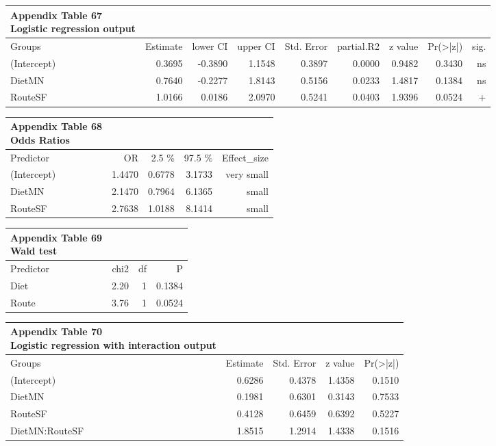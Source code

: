 \documentclass[
  12pt,
  letterpaper,
]{article}
\begin{document}
\begingroup
\fontsize{12.0pt}{14.4pt}\selectfont
\begin{longtable}{l|rrrrrrrr}
\caption*{
{\large \textbf{Appendix Table 67}} \\ 
{\small \textbf{Logistic regression output}}
} \\ 
\toprule
Groups & {Estimate} & {lower CI} & {upper CI} & {Std. Error} & {partial.R2} & {z value} & {Pr(>|z|)} & {sig.} \\ 
\midrule\addlinespace[2.5pt]
(Intercept) & 0.3695 & -0.3890 & 1.1548 & 0.3897 & 0.0000 & 0.9482 & 0.3430 & ns \\ 
DietMN & 0.7640 & -0.2277 & 1.8143 & 0.5156 & 0.0233 & 1.4817 & 0.1384 & ns \\ 
RouteSF & 1.0166 & 0.0186 & 2.0970 & 0.5241 & 0.0403 & 1.9396 & 0.0524 & + \\ 
\bottomrule
\end{longtable}
\endgroup

\begingroup
\fontsize{12.0pt}{14.4pt}\selectfont
\begin{longtable}{l|rrrr}
\caption*{
{\large \textbf{Appendix Table 68}} \\ 
{\small \textbf{Odds Ratios}}
} \\ 
\toprule
Predictor & {OR} & 2.5 \% & 97.5 \% & Effect\_size \\ 
\midrule\addlinespace[2.5pt]
(Intercept) & 1.4470 & 0.6778 & 3.1733 & very small \\ 
DietMN & 2.1470 & 0.7964 & 6.1365 & small \\ 
RouteSF & 2.7638 & 1.0188 & 8.1414 & small \\ 
\bottomrule
\end{longtable}
\endgroup

\begingroup
\fontsize{12.0pt}{14.4pt}\selectfont
\begin{longtable}{l|rrr}
\caption*{
{\large \textbf{Appendix Table 69}} \\ 
{\small \textbf{Wald test}}
} \\ 
\toprule
Predictor & {chi2} & {df} & {P} \\ 
\midrule\addlinespace[2.5pt]
Diet & 2.20 & 1 & 0.1384 \\ 
Route & 3.76 & 1 & 0.0524 \\ 
\bottomrule
\end{longtable}
\endgroup

\begingroup
\fontsize{12.0pt}{14.4pt}\selectfont
\begin{longtable}{l|rrrr}
\caption*{
{\large \textbf{Appendix Table 70}} \\ 
{\small \textbf{Logistic regression with interaction output}}
} \\ 
\toprule
Groups & {Estimate} & {Std. Error} & {z value} & {Pr(>|z|)} \\ 
\midrule\addlinespace[2.5pt]
(Intercept) & 0.6286 & 0.4378 & 1.4358 & 0.1510 \\ 
DietMN & 0.1981 & 0.6301 & 0.3143 & 0.7533 \\ 
RouteSF & 0.4128 & 0.6459 & 0.6392 & 0.5227 \\ 
DietMN:RouteSF & 1.8515 & 1.2914 & 1.4338 & 0.1516 \\ 
\bottomrule
\end{longtable}
\endgroup
\end{document}
